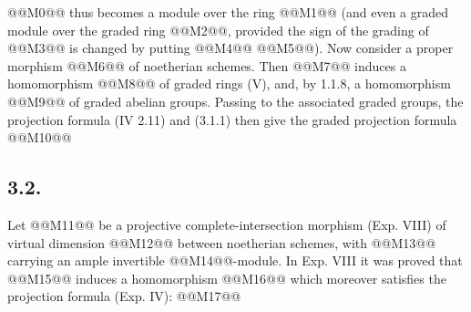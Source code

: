 
@@M0@@ thus becomes a module over the ring @@M1@@ (and even a graded module over the graded ring @@M2@@, provided the sign of the grading of @@M3@@ is changed by putting @@M4@@ @@M5@@).
Now consider a proper morphism
@@M6@@
of noetherian schemes. Then @@M7@@ induces a homomorphism
@@M8@@
of graded rings (V), and, by 1.1.8, a homomorphism
@@M9@@
of graded abelian groups. Passing to the associated graded groups, the projection formula (IV 2.11) and (3.1.1) then give the graded projection formula
@@M10@@

\subsection*{3.2.}
Let @@M11@@ be a projective complete-intersection morphism (Exp. VIII) of virtual dimension @@M12@@ between noetherian schemes, with @@M13@@ carrying an ample invertible @@M14@@-module. In Exp. VIII it was proved that @@M15@@ induces a homomorphism
@@M16@@
which moreover satisfies the projection formula (Exp. IV):
@@M17@@

